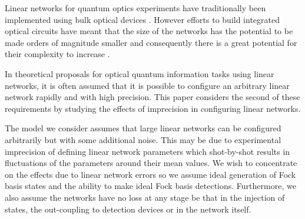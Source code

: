 \documentclass[aps,pra,twocolumn,superscriptaddress,numerical,floatfix]{revtex4-1}
\begin{document}
Linear networks for quantum optics experiments have traditionally been implemented using bulk optical devices \cite{OQC}. 
However efforts to build integrated optical circuits have meant that the size of the networks has the potential to be made orders of magnitude smaller and consequently there is a great potential for their complexity to increase \cite{thompson2011integrated}.

In theoretical proposals for optical quantum information tasks using linear networks, it is often assumed that it is possible to configure an arbitrary linear network rapidly and with high precision.  This paper considers the second of these requirements by studying the effects of imprecision in configuring linear networks.

The model we consider assumes that large linear networks can be configured arbitrarily but with some additional noise.  This may be due to experimental imprecision of defining linear network parameters which shot-by-shot results in fluctuations of the parameters around their mean values.  We wish to concentrate on the effects due to linear network errors so we assume ideal generation of Fock basis states and the ability to make ideal Fock basis detections. Furthermore, we also assume the networks have no loss at any stage be that in the injection of states, the out-coupling to detection devices or in the network itself.  
\end{document}
